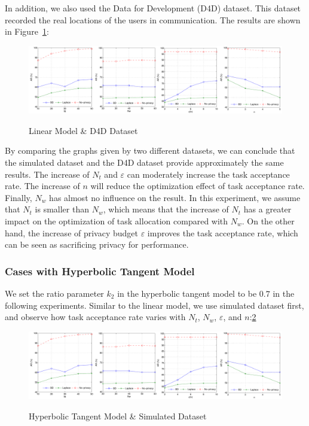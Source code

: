 In addition, we also used the Data for Development (D4D) dataset. This dataset recorded the real locations of the users in communication. The results are shown in Figure~\ref{img:LinD4D}:

\begin{figure}
\includegraphics[width=1\textwidth]{LinD4D}
\label{img:LinD4D}
\caption{Linear Model \& D4D Dataset}
\end{figure}

By comparing the graphs given by two different datasets, we can conclude that the simulated dataset and the D4D dataset provide approximately the same results. The increase of $N_t$ and $\varepsilon$ can moderately increase the task acceptance rate. The increase of $n$ will reduce the optimization effect of task acceptance rate. Finally, $N_w$ has almost no influence on the result. In this experiment, we assume that $N_t$ is smaller than $N_w$, which means that the increase of $N_t$ has a greater impact on the optimization of task allocation compared with $N_w$. On the other hand, the increase of privacy budget $\varepsilon$ improves the task acceptance rate, which can be seen as sacrificing privacy for performance.

\subsubsection{Cases with Hyperbolic Tangent Model}
We set the ratio parameter $k_2$ in the hyperbolic tangent model to be $0.7$ in the following experiments. Similar to the linear model, we use simulated dataset first, and observe how task acceptance rate varies with $N_t$, $N_w$, $\varepsilon$, and $n$:\ref{img:TanhSim}

\begin{figure}
\includegraphics[width=1\textwidth]{TanhSim}
\label{img:TanhSim}
\caption{Hyperbolic Tangent Model \& Simulated Dataset}
\end{figure}

